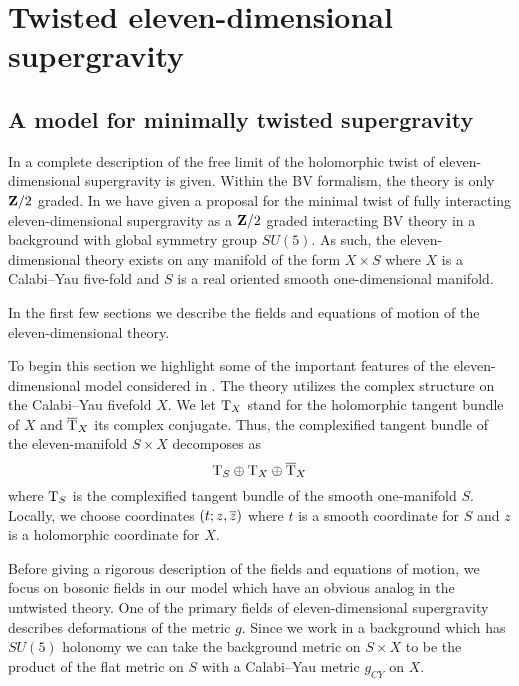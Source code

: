 \documentclass[11pt]{amsart}%
\begin{document}
\section{Twisted eleven-dimensional supergravity}
%
\subsection{A model for minimally twisted supergravity}

In \cite{SWspinor} a complete description of the free limit of the holomorphic twist of eleven-dimensional supergravity is given.
Within the BV formalism, the theory is only $\mathbf{Z}/2$ graded.
In \cite{RSW} we have given a proposal for the minimal twist of fully interacting eleven-dimensional supergravity as a $\mathbf{Z}/2$ graded interacting BV theory in a background with global symmetry group $SU(5)$.
As such, the eleven-dimensional theory exists on any manifold of the form $X \times S$ where $X$ is a Calabi--Yau five-fold and $S$ is a real oriented smooth one-dimensional manifold.

In the first few sections we describe the fields and equations of motion of the eleven-dimensional theory. 

%

\parsec[s:sugrafields]

To begin this section we highlight some of the important features of the eleven-dimensional model considered in \cite{RSW}. 
The theory utilizes the complex structure on the Calabi--Yau fivefold $X$.
We let ${\rm T}_X$ stand for the holomorphic tangent bundle of $X$ and $\overline{{\rm T}}_X$ its complex conjugate.
Thus, the complexified tangent bundle of the eleven-manifold $S \times X$ decomposes as
\[
{\rm T}_S \oplus {\rm T}_X \oplus \overline{{\rm T}}_X 
\]
where ${\rm T}_S$ is the complexified tangent bundle of the smooth one-manifold $S$.
Locally, we choose coordinates $(t;z,\overline{z})$ where $t$ is a smooth coordinate for $S$ and $z$ is a holomorphic coordinate for $X$. 

Before giving a rigorous description of the fields and equations of motion, we focus on bosonic fields in our model which have an obvious analog in the untwisted theory. 
One of the primary fields of eleven-dimensional supergravity describes deformations of the metric $g$.
Since we work in a background which has $SU(5)$ holonomy we can take the background metric on $S \times X$ to be the product of the flat metric on $S$ with a Calabi--Yau metric $g_{CY}$ on $X$. 
\end{document}
